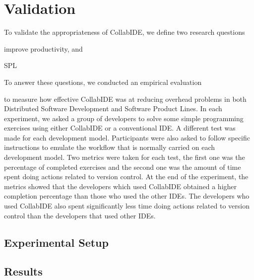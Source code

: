 

\section{Validation}
\label{sec:validation}

To validate the appropriateness of CollabIDE, we define two research questions
\begin{enumerate*}[label=(\arabic*)]
\item improve productivity, and
\item SPL
\end{enumerate*} 
To answer these questions, we conducted an empirical evaluation 

to measure how effective CollabIDE was at reducing overhead problems 
in both Distributed Software Development and Software Product Lines. In each experiment, we asked 
a group of developers to solve some simple programming exercises using either CollabIDE or a 
conventional IDE. A different test was made for each development model. Participants were also 
asked to follow specific instructions to emulate the workflow that is normally carried on each 
development model. Two metrics were taken for each test, the first one was the percentage of 
completed exercises and the second one was the amount of time spent doing actions related to 
version control.
At the end of the experiment, the metrics showed that the developers which used CollabIDE obtained 
a higher completion percentage than those who used the other IDEs. The developers who used 
CollabIDE also spent significantly less time doing actions related to version control than the 
developers that used other IDEs.

\subsection{Experimental Setup}


\subsection{Results}



\endinput
